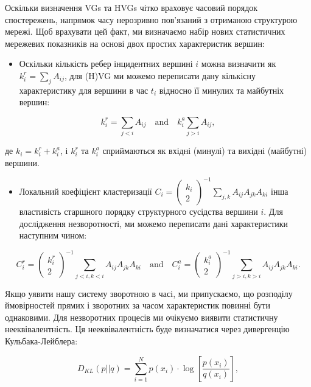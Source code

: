 \documentclass[
  letterpaper,
]{report}
\providecommand{\tightlist}{%
  \setlength{\itemsep}{0pt}\setlength{\parskip}{0pt}}\usepackage{longtable,booktabs,array}
\begin{document}
Оскільки визначення VGs та HVGs чітко враховує часовий порядок
спостережень, напрямок часу нерозривно пов'язаний з отриманою структурою
мережі. Щоб врахувати цей факт, ми визначаємо набір нових статистичних
мережевих показників на основі двох простих характеристик вершин:

\begin{itemize}
\tightlist
\item
  Оскільки кількість ребер інцидентних вершині \(i\) можна визначити як
  \(k_{i}^{r} = \sum_{j} A_{ij}\), для (H)VG ми можемо переписати дану
  кількісну характеристику для вершини в час \(t_{i}\) відносно її
  минулих та майбутніх вершин:
\end{itemize}

\[ 
k_{i}^{r} = \sum_{j<i} A_{ij} \quad \mathrm{and} \quad k_{i}^{a} \sum_{j>i} A_{ij}, 
\]

де \(k_{i} = k_{i}^{r} + k_{i}^{a}\), і \(k_{i}^{r}\) та \(k_{i}^{a}\)
сприймаються як вхідні (минулі) та вихідні (майбутні) вершини.

\begin{itemize}
\tightlist
\item
  Локальний коефіцієнт кластеризації
  \(C_{i} = \left( \begin{matrix} k_{i}\\ 2 \end{matrix} \right)^{-1} \sum_{j,k} A_{ij}A_{jk}A_{ki}\)
  інша властивість старшного порядку структурного сусідства вершини
  \(i\). Для дослідження незворотності, ми можемо переписати дані
  характеристики наступним чином:
\end{itemize}

\[ 
C_{i}^{r} = \left( \begin{matrix} k_{i}^{r}\\ 2 \end{matrix} \right)^{-1} \sum_{j<i,k<i} A_{ij}A_{jk}A_{ki} \quad \textrm{and} \quad C_{i}^{a} = \left( \begin{matrix} k_{i}^{a}\\ 2 \end{matrix} \right)^{-1} \sum_{j>i,k>i} A_{ij}A_{jk}A_{ki}. 
\]

Якщо уявити нашу систему зворотною в часі, ми припускаємо, що розподілу
ймовірностей прямих і зворотних за часом характеристик повинні бути
однаковими. Для незворотних процесів ми очікуємо виявити статистичну
нееквівалентність. Ця нееквівалентність буде визначатися через
дивергенцію Кульбака-Лейблера:

\[ 
D_{KL}(p||q) = \sum_{i=1}^{N} p(x_{i}) \cdot \log{\left[ \frac{p(x_{i})}{q(x_{i})} \right]}, 
\]
\end{document}
